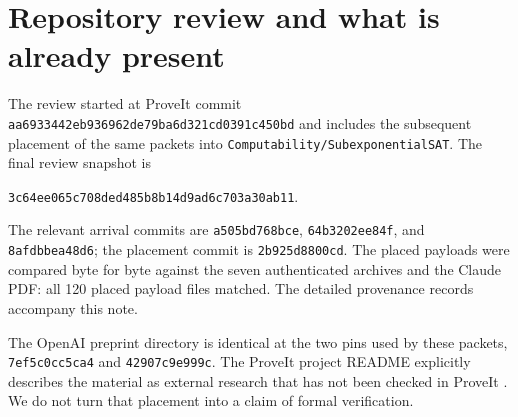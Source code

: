 \documentclass[11pt,letterpaper]{article}
\theoremstyle{definition}\newtheorem{definition}[theorem]{Definition}
\theoremstyle{remark}\newtheorem{remark}[theorem]{Remark}
\newcommand{\pin}{\texttt{3c64ee065c708ded485b8b14d9ad6c703a30ab11}}
\begin{document}
\section{Repository review and what is already present}
\label{sec:review}

The review started at ProveIt commit
\texttt{aa6933442eb936962de79ba6d321cd0391c450bd} and includes the
subsequent placement of the same packets into
\texttt{Computability/SubexponentialSAT}. The final review snapshot is
\begin{center}\pin.\end{center}
The relevant arrival commits are
\texttt{a505bd768bce}, \texttt{64b3202ee84f}, and
\texttt{8afdbbea48d6}; the placement commit is
\texttt{2b925d8800cd}. The placed payloads were compared byte for byte
against the seven authenticated archives and the Claude PDF: all 120 placed
payload files matched. The detailed provenance records accompany this note.

The OpenAI preprint directory is identical at the two pins used by these
packets, \texttt{7ef5c0cc5ca4} and \texttt{42907c9e999c}. The
ProveIt project README explicitly describes the material as external research
that has not been checked in ProveIt \cite{proveit}. We do not turn that
placement into a claim of formal verification.
\end{document}
